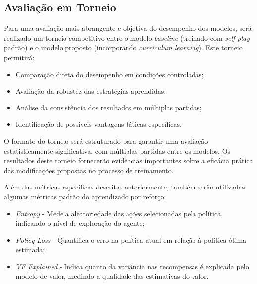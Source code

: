 \subsection{Avaliação em Torneio}

Para uma avaliação mais abrangente e objetiva do desempenho dos modelos, será realizado um torneio competitivo entre o modelo \textit{baseline} (treinado com \textit{self-play} padrão) e o modelo proposto (incorporando \textit{curriculum learning}). Este torneio permitirá:

\begin{itemize}
    \item Comparação direta do desempenho em condições controladas;
    \item Avaliação da robustez das estratégias aprendidas;
    \item Análise da consistência dos resultados em múltiplas partidas;
    \item Identificação de possíveis vantagens táticas específicas.
\end{itemize}

O formato do torneio será estruturado para garantir uma avaliação estatisticamente significativa, com múltiplas partidas entre os modelos. Os resultados deste torneio fornecerão evidências importantes sobre a eficácia prática das modificações propostas no processo de treinamento.


Além das métricas específicas descritas anteriormente, também serão utilizadas algumas métricas padrão do aprendizado por reforço:

\begin{itemize}
    \item \textit{Entropy} - Mede a aleatoriedade das ações selecionadas pela política, indicando o nível de exploração do agente;
    \item \textit{Policy Loss} - Quantifica o erro na política atual em relação à política ótima estimada;
    \item \textit{VF Explained} - Indica quanto da variância nas recompensas é explicada pelo modelo de valor, medindo a qualidade das estimativas do valor.
\end{itemize}


